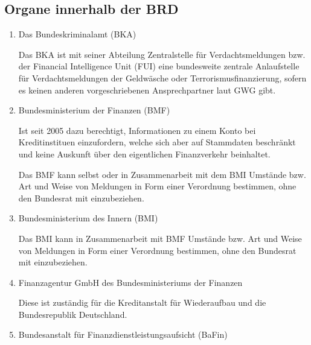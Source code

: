 \documentclass{article}
\begin{document}
        \subsection[Organe BRD]{Organe innerhalb der BRD}

            \begin{enumerate}

                \item Das Bundeskriminalamt (BKA)

                    Das BKA ist mit seiner Abteilung Zentralstelle für Verdachtsmeldungen bzw. der Financial Intelligence Unit (FUI) eine bundesweite zentrale Anlaufstelle für Verdachtsmeldungen der Geldwäsche oder Terrorismusfinanzierung, sofern es keinen anderen vorgeschriebenen Ansprechpartner laut GWG gibt.

                \item Bundesministerium der Finanzen (BMF)

                    Ist seit 2005 dazu berechtigt, Informationen zu einem Konto bei Kreditinstituen einzufordern, welche sich aber auf Stammdaten beschränkt und keine Auskunft über den eigentlichen Finanzverkehr beinhaltet. \cite{Tätigkeitsbericht}

                    Das BMF kann selbst oder in Zusammenarbeit mit dem BMI Umstände bzw. Art und Weise von Meldungen in Form einer Verordnung bestimmen, ohne den Bundesrat mit einzubeziehen.

                \item Bundesministerium des Innern (BMI)

                    Das BMI kann in Zusammenarbeit mit BMF Umstände bzw. Art und Weise von Meldungen in Form einer Verordnung bestimmen, ohne den Bundesrat mit einzubeziehen.                

                \item Finanzagentur GmbH des Bundesministeriums der Finanzen

                    Diese ist zuständig für die Kreditanstalt für Wiederaufbau und die Bundesrepublik Deutschland.

\newpage

                \item Bundesanstalt für Finanzdienstleistungsaufsicht (BaFin)


\end{enumerate}
\end{document}
